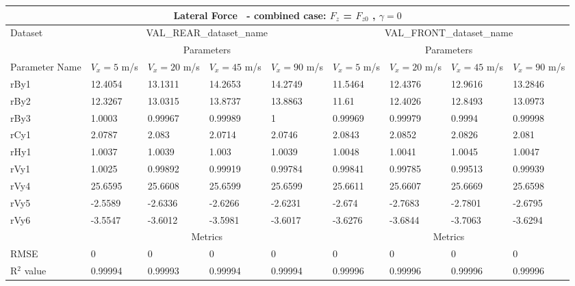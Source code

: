         \begin{tabular}{lllll|llll} \hline \multicolumn{9}{c}{Lateral Force~ - combined case: $F_z$ = $F_{z0}$ , $\gamma=0$}                                                                                                                                                                        \\ \hline Dataset                         & \multicolumn{4}{c|}{VAL\_REAR\_dataset\_name}                                                & \multicolumn{4}{c}{VAL\_FRONT\_dataset\_name}                                                     \\ \hline \multicolumn{1}{c}{}            & \multicolumn{4}{c|}{Parameters}                                                              & \multicolumn{4}{c}{Parameters}                                                                    \\ \hline Parameter Name                  & $V_x = 5$ m/s     & $V_x = 20$ m/s     & $V_x = 45$ m/s     & $V_x = 90$ m/s     & $V_x = 5$ m/s      & $V_x = 20$ m/s      & $V_x = 45$ m/s      & $V_x = 90$ m/s       \\ rBy1                            & 12.4054 & 13.1311 & 14.2653 & 14.2749 & 11.5464 & 12.4376 & 12.9616 & 13.2846  \\ rBy2                            & 12.3267 & 13.0315 & 13.8737 & 13.8863 & 11.61 & 12.4026 & 12.8493 & 13.0973  \\ rBy3                            & 1.0003 & 0.99967 & 0.99989 & 1 & 0.99969 & 0.99979 & 0.9994 & 0.99998  \\ rCy1                            & 2.0787 & 2.083 & 2.0714 & 2.0746 & 2.0843 & 2.0852 & 2.0826 & 2.081  \\ rHy1                            & 1.0037 & 1.0039 & 1.003 & 1.0039 & 1.0048 & 1.0041 & 1.0045 & 1.0047  \\ rVy1                            & 1.0025 & 0.99892 & 0.99919 & 0.99784 & 0.99841 & 0.99785 & 0.99513 & 0.99939  \\ rVy4                            & 25.6595 & 25.6608 & 25.6599 & 25.6599 & 25.6611 & 25.6607 & 25.6669 & 25.6598  \\ rVy5                            & -2.5589 & -2.6336 & -2.6266 & -2.6231 & -2.674 & -2.7683 & -2.7801 & -2.6795  \\ rVy6                            & -3.5547 & -3.6012 & -3.5981 & -3.6017 & -3.6276 & -3.6844 & -3.7063 & -3.6294  \\ \hline \multicolumn{1}{c|}{}           & \multicolumn{4}{c|}{Metrics}                                                                 & \multicolumn{4}{c}{Metrics}                                                                       \\ \hline RMSE                            & 0 & 0 & 0 & 0 & 0 & 0 & 0 & 0  \\ R$^2$ value                       & 0.99994   & 0.99993   & 0.99994   & 0.99994   & 0.99996   & 0.99996   & 0.99996   & 0.99996    \\ \hline \end{tabular} 